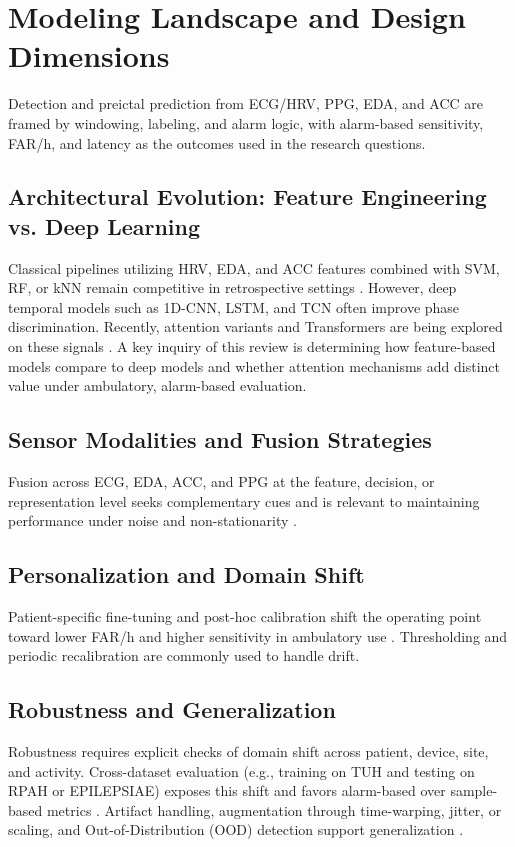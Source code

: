 \section{Modeling Landscape and Design Dimensions}

Detection and preictal prediction from ECG/HRV, PPG, EDA, and ACC are
framed by windowing, labeling, and alarm logic, with alarm-based
sensitivity, FAR/h, and latency as the outcomes used in the research
questions.

\subsection{Architectural Evolution: Feature Engineering vs. Deep Learning}
Classical pipelines utilizing HRV, EDA, and ACC features combined with
SVM, RF, or kNN remain competitive in retrospective settings
\parencite{sethFeasibilityCardiacbasedSeizure2023,masonHeartRateVariability2024}.
However, deep temporal models such as 1D-CNN, LSTM, and TCN often
improve phase discrimination. Recently, attention variants and
Transformers are being explored on these signals
\parencite{yangMultimodalAISystem2022,pordoyEnhancedNonEEGMultimodal2025,
abtahiIdentificationRelevantECG2025,kalousiosECGbasedEpilepticSeizure2024}.
A key inquiry of this review is determining how feature-based models
compare to deep models and whether attention mechanisms add distinct
value under ambulatory, alarm-based evaluation.

\subsection{Sensor Modalities and Fusion Strategies}
Fusion across ECG, EDA, ACC, and PPG at the feature, decision, or
representation level seeks complementary cues and is relevant to
maintaining performance under noise and non-stationarity
\parencite{yangMultimodalAISystem2022,pordoyEnhancedNonEEGMultimodal2025}.

\subsection{Personalization and Domain Shift}
Patient-specific fine-tuning and post-hoc calibration
shift the operating point toward lower FAR/h and higher sensitivity in
ambulatory use \parencite{andradePerformanceSeizurePrediction2024}.
Thresholding and periodic recalibration are commonly used to handle
drift.

\subsection{Robustness and Generalization}
Robustness requires explicit checks of domain shift across patient,
device, site, and activity. Cross-dataset evaluation (e.g., training
on TUH and testing on RPAH or EPILEPSIAE) exposes this shift and favors
alarm-based over sample-based metrics
\parencite{yangMultimodalAISystem2022,andradePerformanceSeizurePrediction2024}.
Artifact handling, augmentation through time-warping, jitter, or
scaling, and Out-of-Distribution (OOD) detection support
generalization \parencite{kalousiosECGbasedEpilepticSeizure2024,
sethFeasibilityCardiacbasedSeizure2023}.

